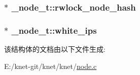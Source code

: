 \subsubsection[{rwlock\+\_\+node\+\_\+hash}]{$\ast$ \+\_\+node\+\_\+t\+::rwlock\+\_\+node\+\_\+hash}\label{a00042_a0bdfa24aaf39fc465bb6d299df6e96d2_a0bdfa24aaf39fc465bb6d299df6e96d2}
\hypertarget{a00042_ae16d549727faf60286005d7b2f9bb1ac_ae16d549727faf60286005d7b2f9bb1ac}{}
\subsubsection[{white\+\_\+ips}]{$\ast$ \+\_\+node\+\_\+t\+::white\+\_\+ips}\label{a00042_ae16d549727faf60286005d7b2f9bb1ac_ae16d549727faf60286005d7b2f9bb1ac}


该结构体的文档由以下文件生成\+:\begin{DoxyCompactItemize}
\item 
E\+:/knet-\/git/knet/knet/\hyperlink{a00101}{node.\+c}\end{DoxyCompactItemize}
